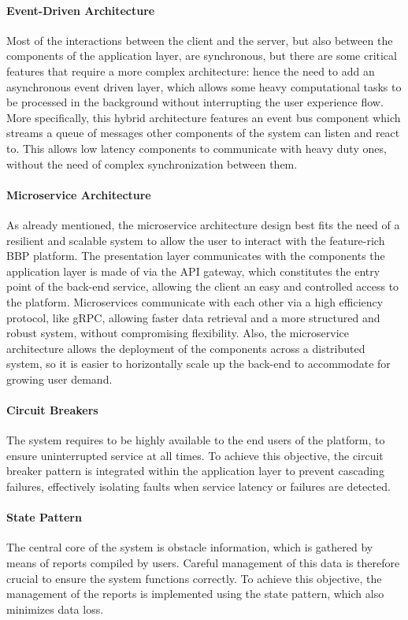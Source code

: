 \paragraph{Event-Driven Architecture}
Most of the interactions between the client and the server, but also between the components of the application layer, are synchronous, but there are some critical features that require a more complex architecture: hence the need to add an asynchronous event driven layer, which allows some heavy computational tasks to be processed in the background without interrupting the user experience flow. More specifically, this hybrid architecture features an event bus component which streams a queue of messages other components of the system can listen and react to. This allows low latency components to communicate with heavy duty ones, without the need of complex synchronization between them.

\paragraph{Microservice Architecture}
As already mentioned, the microservice architecture design best fits the need of a resilient and scalable system to allow the user to interact with the feature-rich BBP platform. The presentation layer communicates with the components the application layer is made of via the API gateway, which constitutes the entry point of the back-end service, allowing the client an easy and controlled access to the platform. Microservices communicate with each other via a high efficiency protocol, like gRPC, allowing faster data retrieval and a more structured and robust system, without compromising flexibility. Also, the microservice architecture allows the deployment of the components across a distributed system, so it is easier to horizontally scale up the back-end to accommodate for growing user demand.

\paragraph{Circuit Breakers}
The system requires to be highly available to the end users of the platform, to ensure uninterrupted service at all times. To achieve this objective, the circuit breaker pattern is integrated within the application layer to prevent cascading failures, effectively isolating faults when service latency or failures are detected.

\paragraph{State Pattern}
The central core of the system is obstacle information, which is gathered by means of reports compiled by users. Careful management of this data is therefore crucial to ensure the system functions correctly. To achieve this objective, the management of the reports is implemented using the state pattern, which also minimizes data loss.

